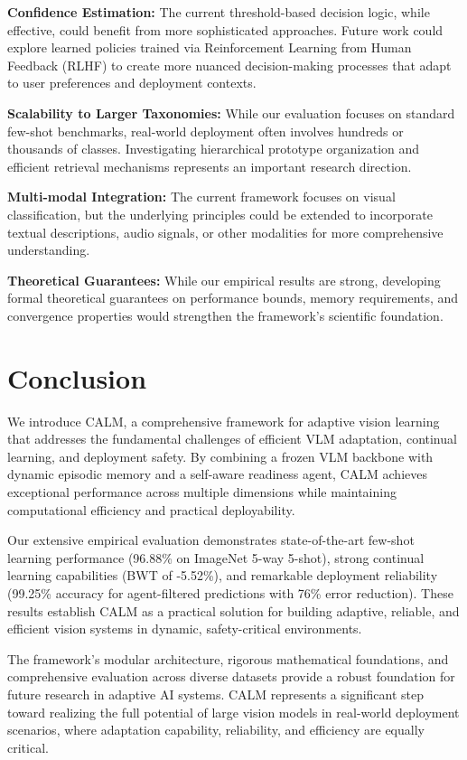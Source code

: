 \documentclass[conference]{IEEEtran}
\begin{document}
\textbf{Confidence Estimation:} The current threshold-based decision logic, while effective, could benefit from more sophisticated approaches. Future work could explore learned policies trained via Reinforcement Learning from Human Feedback (RLHF) to create more nuanced decision-making processes that adapt to user preferences and deployment contexts.

\textbf{Scalability to Larger Taxonomies:} While our evaluation focuses on standard few-shot benchmarks, real-world deployment often involves hundreds or thousands of classes. Investigating hierarchical prototype organization and efficient retrieval mechanisms represents an important research direction.

\textbf{Multi-modal Integration:} The current framework focuses on visual classification, but the underlying principles could be extended to incorporate textual descriptions, audio signals, or other modalities for more comprehensive understanding.

\textbf{Theoretical Guarantees:} While our empirical results are strong, developing formal theoretical guarantees on performance bounds, memory requirements, and convergence properties would strengthen the framework's scientific foundation.

\section{Conclusion}

We introduce CALM, a comprehensive framework for adaptive vision learning that addresses the fundamental challenges of efficient VLM adaptation, continual learning, and deployment safety. By combining a frozen VLM backbone with dynamic episodic memory and a self-aware readiness agent, CALM achieves exceptional performance across multiple dimensions while maintaining computational efficiency and practical deployability.

Our extensive empirical evaluation demonstrates state-of-the-art few-shot learning performance (96.88\% on ImageNet 5-way 5-shot), strong continual learning capabilities (BWT of -5.52\%), and remarkable deployment reliability (99.25\% accuracy for agent-filtered predictions with 76\% error reduction). These results establish CALM as a practical solution for building adaptive, reliable, and efficient vision systems in dynamic, safety-critical environments.

The framework's modular architecture, rigorous mathematical foundations, and comprehensive evaluation across diverse datasets provide a robust foundation for future research in adaptive AI systems. CALM represents a significant step toward realizing the full potential of large vision models in real-world deployment scenarios, where adaptation capability, reliability, and efficiency are equally critical.
\end{document}
